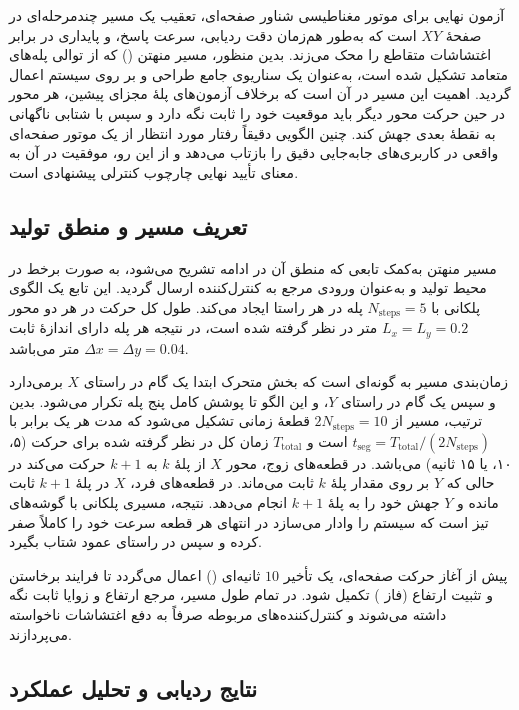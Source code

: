 آزمون نهایی برای موتور مغناطیسی شناور صفحه‌ای، تعقیب یک مسیر چندمرحله‌ای در صفحهٔ $XY$ است که به‌طور هم‌زمان دقت ردیابی، سرعت پاسخ، و پایداری در برابر اغتشاشات متقاطع را محک می‌زند. بدین منظور، مسیر منهتن () که از توالی پله‌های متعامد تشکیل شده است، به‌عنوان یک سناریوی جامع طراحی و بر روی سیستم اعمال گردید. اهمیت این مسیر در آن است که برخلاف آزمون‌های پلهٔ مجزای پیشین، هر محور در حین حرکت محور دیگر باید موقعیت خود را ثابت نگه دارد و سپس با شتابی ناگهانی به نقطهٔ بعدی جهش کند. چنین الگویی دقیقاً رفتار مورد انتظار از یک موتور صفحه‌ای واقعی در کاربری‌های جابه‌جایی دقیق را بازتاب می‌دهد و از این رو، موفقیت در آن به معنای تأیید نهایی چارچوب کنترلی پیشنهادی است.



\subsection{تعریف مسیر و منطق تولید}
\label{subsec:results-manhattan-def}

مسیر منهتن به‌کمک تابعی که منطق آن در ادامه تشریح می‌شود، به صورت برخط در محیط  تولید و به‌عنوان ورودی مرجع به کنترل‌کننده ارسال گردید. این تابع یک الگوی پلکانی با $N_{\text{steps}} = 5$ پله در هر راستا ایجاد می‌کند. طول کل حرکت در هر دو محور $L_x = L_y = 0.2$ متر در نظر گرفته شده است، در نتیجه هر پله دارای اندازهٔ ثابت $\Delta x = \Delta y = 0.04$ متر می‌باشد.

زمان‌بندی مسیر به گونه‌ای است که بخش متحرک ابتدا یک گام در راستای $X$ برمی‌دارد و سپس یک گام در راستای $Y$، و این الگو تا پوشش کامل پنج پله تکرار می‌شود. بدین ترتیب، مسیر از $2N_{\text{steps}} = 10$ قطعهٔ زمانی تشکیل می‌شود که مدت هر یک برابر با $t_{\text{seg}} = T_{\text{total}} / (2N_{\text{steps}})$ است و $T_{\text{total}}$ زمان کل در نظر گرفته شده برای حرکت (۵، ۱۰، یا ۱۵ ثانیه) می‌باشد. در قطعه‌های زوج، محور $X$ از پلهٔ $k$ به $k+1$ حرکت می‌کند در حالی که $Y$ بر روی مقدار پلهٔ $k$ ثابت می‌ماند. در قطعه‌های فرد، $X$ در پلهٔ $k+1$ ثابت مانده و $Y$ جهش خود را به پلهٔ $k+1$ انجام می‌دهد. نتیجه، مسیری پلکانی با گوشه‌های تیز است که سیستم را وادار می‌سازد در انتهای هر قطعه سرعت خود را کاملاً صفر کرده و سپس در راستای عمود شتاب بگیرد.

پیش از آغاز حرکت صفحه‌ای، یک تأخیر $10$ ثانیه‌ای () اعمال می‌گردد تا فرایند برخاستن و تثبیت ارتفاع (فاز ) تکمیل شود. در تمام طول مسیر، مرجع ارتفاع و زوایا ثابت نگه داشته می‌شوند و کنترل‌کننده‌های مربوطه صرفاً به دفع اغتشاشات ناخواسته می‌پردازند.

\subsection{نتایج ردیابی و تحلیل عملکرد}
\label{subsec:results-manhattan-results}


